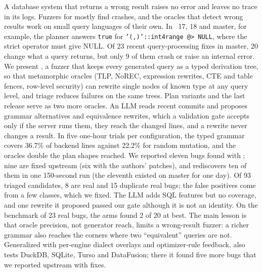 A database system that returns a wrong result raises no error and leaves no
trace in its logs. Fuzzers for \pg mostly find crashes, and the oracles that
detect wrong results work on small query languages of their own. In \pg~17,
18 and master, for example, the planner answers \texttt{true} for
\texttt{'(,)'::int4range @> NULL}, where the strict operator must give NULL.
Of 23 recent query-processing fixes in \pg master, 20 change what a query
returns, but only 9 of them crash or raise an internal error. We present
\tool, a fuzzer that keeps every generated query as a typed derivation tree,
so that metamorphic oracles (TLP, NoREC, expression rewrites, CTE and table
fences, row-level security) can rewrite single nodes of known type at any
query level, and triage reduces failures on the same trees. Plan variants and
the last release serve as two more oracles. An LLM reads recent commits and
proposes grammar alternatives and equivalence rewrites, which a validation
gate accepts only if the server runs them, they reach the changed lines, and
a rewrite never changes a result. In five one-hour trials per
configuration, the typed grammar covers 36.7\% of backend lines against 22.2\%
for random mutation, and the oracles double the plan shapes reached. We reported eleven
bugs found with \tool; nine are fixed
upstream (six with the authors' patches), and \tool rediscovers ten of them in one 150-second run (the eleventh existed on master for one day). Of 93 triaged candidates, 8 are real and 15 duplicate real bugs; the
false positives come from a few classes, which we fixed. The LLM adds SQL
features but no coverage, and one rewrite it proposed passed our gate although
it is not an identity. On the benchmark of 23 real bugs, the arms found
2 of 20 at best. The main lesson is that oracle precision, not generator reach,
limits a wrong-result fuzzer: a richer grammar also reaches the corners where
two ``equivalent'' queries are not. Generalized with per-engine dialect overlays and optimizer-rule
feedback, \tool also tests DuckDB, SQLite, Turso and DataFusion; there it found
five more bugs that we reported upstream with fixes.
